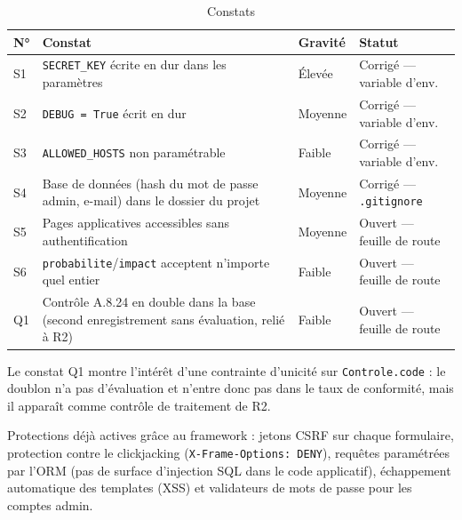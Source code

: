 \documentclass[11pt,a4paper]{article}
\newcommand{\code}[1]{\texttt{#1}}
\begin{document}
\begin{table}[H]
\centering\small
\begin{tabularx}{\linewidth}{@{}lXll@{}}
\toprule
\textbf{N°} & \textbf{Constat} & \textbf{Gravité} & \textbf{Statut}\\
\midrule
S1 & \code{SECRET\_KEY} écrite en dur dans les paramètres & Élevée & Corrigé --- variable d'env.\\
S2 & \code{DEBUG = True} écrit en dur & Moyenne & Corrigé --- variable d'env.\\
S3 & \code{ALLOWED\_HOSTS} non paramétrable & Faible & Corrigé --- variable d'env.\\
S4 & Base de données (hash du mot de passe admin, e-mail) dans le dossier du projet & Moyenne & Corrigé --- \code{.gitignore}\\
S5 & Pages applicatives accessibles sans authentification & Moyenne & Ouvert --- feuille de route\\
S6 & \code{probabilite}/\code{impact} acceptent n'importe quel entier & Faible & Ouvert --- feuille de route\\
Q1 & Contrôle A.8.24 en double dans la base (second enregistrement sans évaluation, relié à R2) & Faible & Ouvert --- feuille de route\\
\bottomrule
\end{tabularx}
\caption{Constats}
\end{table}

Le constat Q1 montre l'intérêt d'une contrainte d'unicité sur \code{Controle.code} : le doublon n'a pas d'évaluation et n'entre donc pas dans le taux de conformité, mais il apparaît comme contrôle de traitement de R2.

Protections déjà actives grâce au framework : jetons CSRF sur chaque formulaire, protection contre le clickjacking (\code{X-Frame-Options: DENY}), requêtes paramétrées par l'ORM (pas de surface d'injection SQL dans le code applicatif), échappement automatique des templates (XSS) et validateurs de mots de passe pour les comptes admin.

\end{document}
